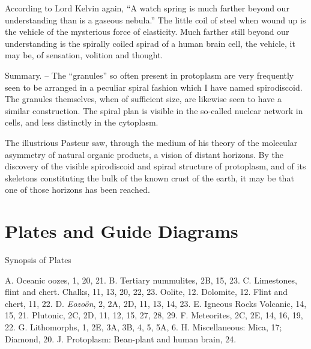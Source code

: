 \documentclass[a4paper, 12pt, oneside]{article}
\begin{document}
According to Lord Kelvin again, ``A watch spring is much farther beyond our understanding than is a gaseous nebula.'' The little coil of steel when wound up is the vehicle of the mysterious force of elasticity. Much farther still beyond our understanding is the spirally coiled spirad of a human brain cell, the vehicle, it may be, of sensation, volition and thought.

Summary. -- The ``granules'' so often present in protoplasm are very frequently seen to be arranged in a peculiar spiral fashion which I have named spirodiscoid. The granules themselves, when of sufficient size, are likewise seen to have a similar construction. The spiral plan is visible in the so-called nuclear network in cells, and less distinctly in the cytoplasm.

The illustrious Pasteur saw, through the medium of his theory of the molecular asymmetry of natural organic products, a vision of distant horizons. By the discovery of the visible spirodiscoid and spirad structure of protoplasm, and of its skeletons constituting the bulk of the known crust of the earth, it may be that one of those horizons has been reached.
\clearpage
\section{Plates and Guide Diagrams}
Synopsis of Plates

A. Oceanic oozes, 1, 20, 21.  
B. Tertiary nummulites, 2B, 15, 23.  
C. Limestones, flint and chert.  
Chalks, 11, 13, 20, 22, 23.  
Oolite, 12.  
Dolomite, 12.  
Flint and chert, 11, 22.  
D. \emph{Eozoön}, 2, 2A, 2D, 11, 13, 14, 23.  
E. Igneous Rocks  
Volcanic, 14, 15, 21.  
Plutonic, 2C, 2D, 11, 12, 15, 27, 28, 29.  
F. Meteorites, 2C, 2E, 14, 16, 19, 22.  
G. Lithomorphs, 1, 2E, 3A, 3B, 4, 5, 5A, 6.  
H. Miscellaneous: Mica, 17; Diamond, 20.  
J. Protoplasm: Bean-plant and human brain, 24.  
\end{document}
